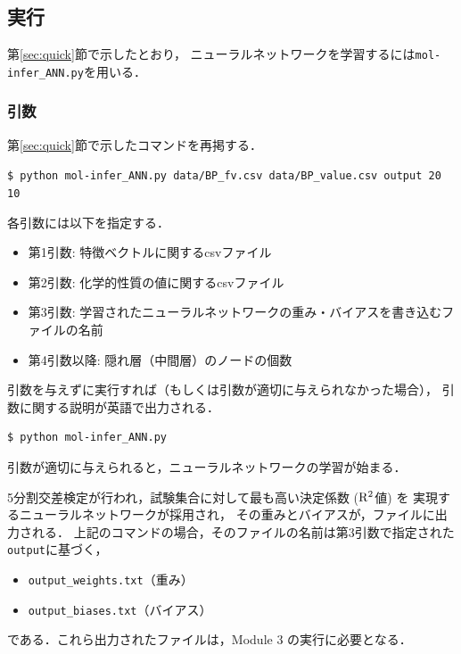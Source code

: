 \documentclass[11pt, titlepage, dvipdfmx, twoside]{jarticle}
\newcommand{\secref}[1]{第\ref{sec:#1}節}
\begin{document}
\subsection{実行}
\secref{quick}で示したとおり，
ニューラルネットワークを学習するには{\tt mol-infer\_ANN.py}を用いる．

\subsubsection{引数}
\secref{quick}で示したコマンドを再掲する．
\begin{oframed}
{\small
\verb|$ python mol-infer_ANN.py data/BP_fv.csv data/BP_value.csv output 20 10|
}
\end{oframed}
各引数には以下を指定する．
\begin{itemize}
\item 第1引数: 特徴ベクトルに関するcsvファイル
\item 第2引数: 化学的性質の値に関するcsvファイル
\item 第3引数: 学習されたニューラルネットワークの重み・バイアスを書き込むファイルの名前
\item 第4引数以降: 隠れ層（中間層）のノードの個数
\end{itemize}

引数を与えずに実行すれば（もしくは引数が適切に与えられなかった場合），
引数に関する説明が英語で出力される．
\begin{oframed}
  {\small
\begin{verbatim}
$ python mol-infer_ANN.py 
\end{verbatim}
  }
  \end{oframed}


引数が適切に与えられると，ニューラルネットワークの学習が始まる．

5分割交差検定が行われ，試験集合に対して最も高い決定係数 (${\rm R}^2$値) を
実現するニューラルネットワークが採用され，
その重みとバイアスが，ファイルに出力される．
上記のコマンドの場合，そのファイルの名前は第3引数で指定された\verb|output|に基づく，
\begin{itemize}
\item \verb|output_weights.txt|（重み）
\item \verb|output_biases.txt|（バイアス）
\end{itemize}
である．これら出力されたファイルは，Module 3 の実行に必要となる．
\end{document}
